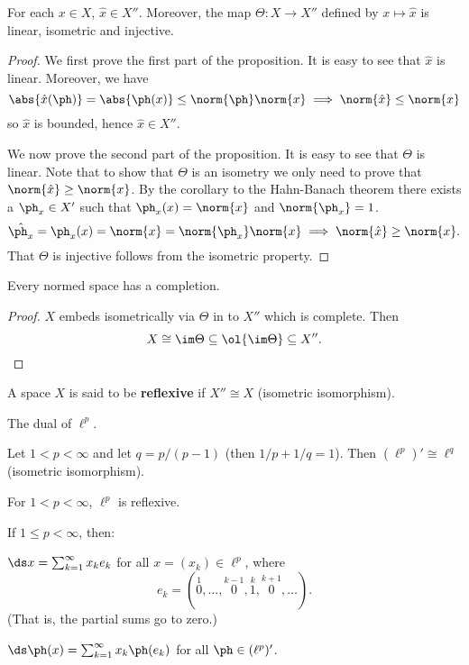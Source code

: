 \begin{prop}
  For each $x \in X$, $\hat x \in X''$.
  Moreover, the map $\Theta: X \to X''$ defined by $x \mapsto \hat x$ is linear, isometric and injective.
\end{prop}

\begin{proof}
  We first prove the first part of the proposition.
  It is easy to see that $\hat x$ is linear.
  Moreover, we have
  \[\abs{\hat x(\ph)} = \abs{\ph(x)} \leq \norm{\ph} \norm{x} \implies \norm{\hat x} \leq \norm{x}\]
  so $\hat x$ is bounded, hence $\hat x \in X''$.

  We now prove the second part of the proposition.
  It is easy to see that $\Theta$ is linear.
  Note that to show that $\Theta$ is an isometry we only need to prove that $\norm{\hat x} \geq \norm{x}$.
  By the corollary to the Hahn-Banach theorem there exists a $\ph_x \in X'$ such that $\ph_x(x) = \norm{x}$ and $\norm{\ph_x}=1$.
  \[\hat{\ph_x} = \ph_x(x) = \norm{x} = \norm{\ph_x}\norm{x} \implies \norm{\hat x} \geq \norm{x}.\]
  That $\Theta$ is injective follows from the isometric property.
\end{proof}

\begin{cor}
  Every normed space has a completion.
\end{cor}

\begin{proof}
  $X$ embeds isometrically via $\Theta$ in to $X''$ which is complete.
  Then
  \[X \cong \im\Theta \subseteq \ol{\im\Theta} \subseteq X''.\]
\end{proof}

\begin{defn}
  A space $X$ is said to be \textbf{reflexive} if $X'' \cong X$ (isometric isomorphism).
\end{defn}

The dual of $\ell^p$.

\begin{thm}
  Let $1<p<\infty$ and let $q = p/(p-1)$ (then $1/p+1/q=1$).
  Then $(\ell^p)' \cong \ell^q$ (isometric isomorphism).
\end{thm}

\begin{cor}
  For $1<p<\infty$, $\ell^p$ is reflexive.
\end{cor}

\begin{lem}
  If $1\leq p<\infty$, then:
  \begin{enum}
    \io
    $\ds x = \sum_{k=1}^\infty x_ke_k$ for all $x = (x_k) \in \ell^p$, where
    \[e_k = (\overset{1}{0},\ldots,\overset{k-1}{0},\overset{k}{1},\overset{k+1}{0},\ldots).\]
  (That is, the partial sums go to zero.)

  \io
  $\ds \ph(x) = \sum_{k=1}^\infty x_k\ph(e_k)$ for all $\ph \in (\ell^p)'$.
  \end{enum}
\end{lem} 

